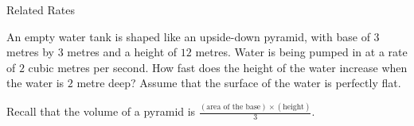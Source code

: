 \documentclass[../main.tex]{subfiles}
\begin{document}
\begin{lesson}{Related Rates}
\begin{example}
  \end{example}
  \clearpage

  \begin{example}
    An empty water tank is shaped like an upside-down pyramid, with base of \(3\) metres by \(3\) metres and a height of \(12\) metres. Water is being pumped in at a rate of \(2\) cubic metres per second. How fast does the height of the water increase when the water is \(2\) metre deep? Assume that the surface of the water is perfectly flat. 

    Recall that the volume of a pyramid is \(\frac{(\text{area of the base}) \times (\text{height})}{3}\).
  \end{example}
\end{lesson}
\end{document}
